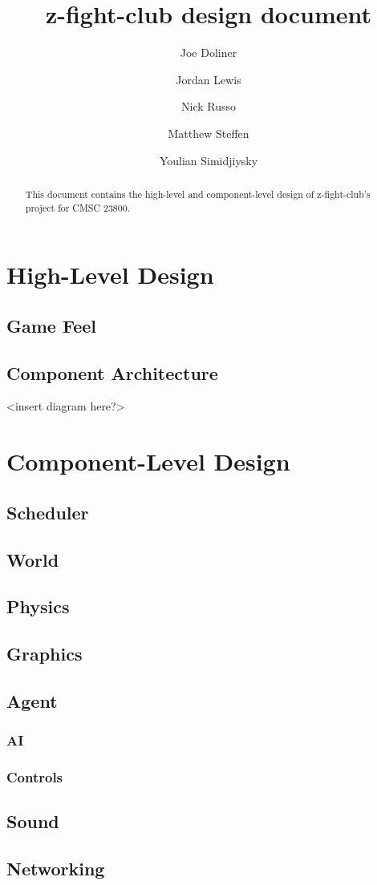\documentclass[12pt]{article}
\title{z-fight-club design document}
\author{Joe Doliner \and Jordan Lewis \and Nick Russo \and Matthew Steffen \and Youlian Simidjiysky}
\begin{document}
\maketitle
\begin{abstract}
This document contains the high-level and component-level design of
z-fight-club's project for CMSC 23800.
\end{abstract}
\section{High-Level Design}
\subsection{Game Feel}
\subsection{Component Architecture}
<insert diagram here?>
\section{Component-Level Design}
\subsection{Scheduler}
\subsection{World}
\subsection{Physics}
\subsection{Graphics}
\subsection{Agent}
\subsubsection{AI}
\subsubsection{Controls}
\subsection{Sound}
\subsection{Networking}
\end{document}
